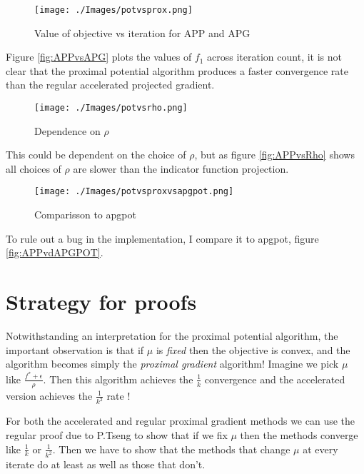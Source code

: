 \documentclass[smallextended]{article}       %
\begin{document}
 \begin{figure}[h]
   \begin{center}
     \texttt{[image: ./Images/potvsprox.png]}
   \end{center}
   \caption{Value of objective vs iteration for APP and APG}
   \label{fig:APPvsAPG}
 \end{figure}
 Figure \eqref{fig:APPvsAPG} plots the values of $f_1$ across iteration count, it is 
 not clear that the proximal potential algorithm produces a faster convergence rate
 than the regular accelerated projected gradient.

 \begin{figure}[h]
   \begin{center}
     \texttt{[image: ./Images/potvsrho.png]}
   \end{center}
   \caption{Dependence on $\rho$}
   \label{fig:APPvsRho}
 \end{figure}

 This could be dependent on the choice of $\rho$, but as figure \eqref{fig:APPvsRho} shows 
 all choices of $\rho$ are slower than the indicator function projection.

\begin{figure}[h]
   \begin{center}
     \texttt{[image: ./Images/potvsproxvsapgpot.png]}
   \end{center}
   \caption{Comparisson to apgpot}
   \label{fig:APPvsAPGPOT}
 \end{figure}

To rule out a bug in the implementation, I compare it to apgpot, figure \eqref{fig:APPvdAPGPOT}.
\section{Strategy for proofs}

 Notwithstanding an interpretation for the proximal potential algorithm,
 the important observation is that if $\mu$ is {\em fixed} then the
 objective is convex, and the algorithm becomes simply the {\em proximal gradient}
 algorithm! Imagine we pick $\mu$ like $\frac{f^*+\epsilon}{\rho}$.  Then this
 algorithm achieves the $\frac{1}{k}$ convergence and the accelerated version
 achieves the $\frac{1}{k^2}$ rate !

 For both the accelerated and regular proximal gradient methods we can use the
 regular proof due to P.Tseng to show that if we fix $\mu$ then the methods
 converge like $\frac{1}{k}$ or $\frac{1}{k^2}$.  Then we have to show that the
 methods that change $\mu$ at every iterate do at least as well as those that
 don't. 
\end{document}
